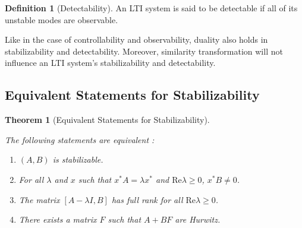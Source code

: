 \documentclass[
]{book}
\newtheorem{theorem}{Theorem}[chapter]
\theoremstyle{definition}
\newtheorem{definition}{Definition}[chapter]
\theoremstyle{definition}
\theoremstyle{definition}
\theoremstyle{definition}
\theoremstyle{remark}
\begin{document}
\begin{definition}[Detectability]
\protect\hypertarget{def:ltidetectable}{}\label{def:ltidetectable}An LTI system is said to be detectable if all of its unstable modes are observable.
\end{definition}

Like in the case of controllability and observability, duality also holds in stabilizability and detectability. Moreover, similarity transformation will not influence an LTI system's stabilizability and detectability.

\hypertarget{equivalent-statements-for-stabilizability}{%
\subsection{Equivalent Statements for Stabilizability}\label{equivalent-statements-for-stabilizability}}

\begin{theorem}[Equivalent Statements for Stabilizability]
\protect\hypertarget{thm:ltistabilizable}{}\label{thm:ltistabilizable}

The following statements are equivalent \citep{zhou1996book-robust}:

\begin{enumerate}
\def\labelenumi{\arabic{enumi}.}
\item
  \((A,B)\) is stabilizable.
\item
  For all \(\lambda\) and \(x\) such that \(x^* A = \lambda x^*\) and \(\text{Re} \lambda \ge 0\), \(x^* B \ne 0\).
\item
  The matrix \([A-\lambda I, B]\) has full rank for all \(\text{Re} \lambda \ge 0\).
\item
  There exists a matrix \(F\) such that \(A+BF\) are Hurwitz.
\end{enumerate}

\end{theorem}
\end{document}
